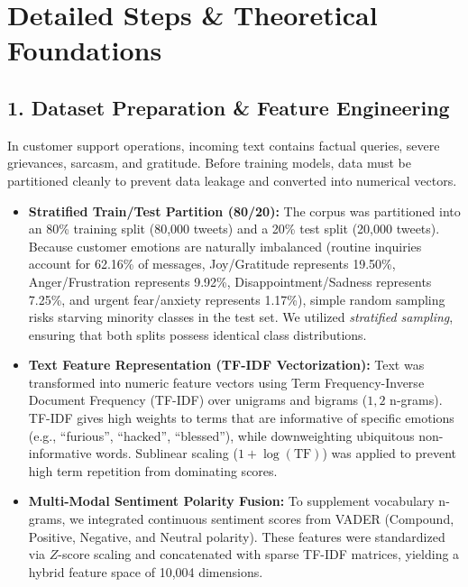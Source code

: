 \documentclass[11pt, a4paper]{article}
\begin{document}
\section*{Detailed Steps \& Theoretical Foundations}

\subsection*{1. Dataset Preparation \& Feature Engineering}
In customer support operations, incoming text contains factual queries, severe grievances, sarcasm, and gratitude. Before training models, data must be partitioned cleanly to prevent data leakage and converted into numerical vectors.

\begin{itemize}[leftmargin=1.5em]
    \item \textbf{Stratified Train/Test Partition (80/20):}
    The corpus was partitioned into an 80\% training split (80,000 tweets) and a 20\% test split (20,000 tweets). 
    Because customer emotions are naturally imbalanced (routine inquiries account for 62.16\% of messages, Joy/Gratitude represents 19.50\%, Anger/Frustration represents 9.92\%, Disappointment/Sadness represents 7.25\%, and urgent fear/anxiety represents 1.17\%), simple random sampling risks starving minority classes in the test set. We utilized \textit{stratified sampling}, ensuring that both splits possess identical class distributions.
    
    \item \textbf{Text Feature Representation (TF-IDF Vectorization):}
    Text was transformed into numeric feature vectors using Term Frequency-Inverse Document Frequency (TF-IDF) over unigrams and bigrams ($1, 2$ n-grams). TF-IDF gives high weights to terms that are informative of specific emotions (e.g., ``furious'', ``hacked'', ``blessed''), while downweighting ubiquitous non-informative words. Sublinear scaling ($1 + \log(\text{TF})$) was applied to prevent high term repetition from dominating scores.
    
    \item \textbf{Multi-Modal Sentiment Polarity Fusion:}
    To supplement vocabulary n-grams, we integrated continuous sentiment scores from VADER (Compound, Positive, Negative, and Neutral polarity). These features were standardized via $Z$-score scaling and concatenated with sparse TF-IDF matrices, yielding a hybrid feature space of 10,004 dimensions.
\end{itemize}
\end{document}
